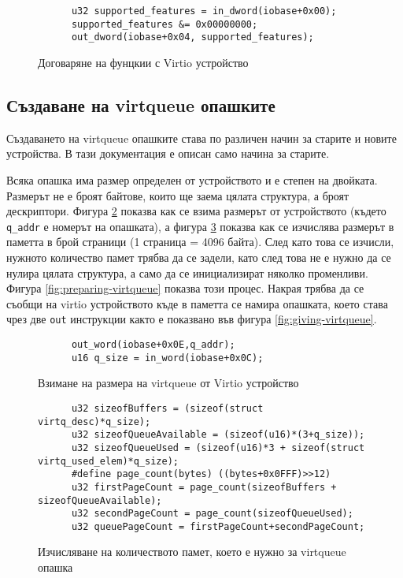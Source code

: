   \begin{figure}[ht]
    \centering
    \begin{verbatim}
      u32 supported_features = in_dword(iobase+0x00);
      supported_features &= 0x00000000;
      out_dword(iobase+0x04, supported_features);
    \end{verbatim}
    \caption{Договаряне на фунцкии с Virtio устройство}
    \label{fig:disabling-all-features}
  \end{figure}

  \subsection{Създаване на virtqueue опашките}
  Създаването на virtqueue опашките става по различен начин за старите и новите устройства. В тази документация е описан само начина за старите.

  Всяка опашка има размер определен от устройството и е степен на двойката. Размерът не е броят байтове, които ще заема цялата структура, а броят дескриптори. Фигура \ref{fig:getting-virtqueue-size} показва как се взима размерът от устройството (където {\tt q\_addr} е номерът на опашката), а фигура \ref{fig:calculating-virtqueue-size} показва как се изчислява размерът в паметта в брой страници (1 страница = 4096 байта). След като това се изчисли, нужното количество памет трябва да се задели, като след това не е нужно да се нулира цялата структура, а само да се инициализират няколко променливи. Фигура \ref{fig:preparing-virtqueue} показва този процес. Накрая трябва да се съобщи на virtio устройството къде в паметта се намира опашката, което става чрез две {\tt out} инструкции както е показвано във фигура \ref{fig:giving-virtqueue}.

  \begin{figure}[ht]
    \centering
    \begin{verbatim}
      out_word(iobase+0x0E,q_addr);
      u16 q_size = in_word(iobase+0x0C);
    \end{verbatim}
    \caption{Взимане на размера на virtqueue от Virtio устройство}
    \label{fig:getting-virtqueue-size}
  \end{figure}

  \begin{figure}[ht]
    \centering
    \begin{verbatim}
      u32 sizeofBuffers = (sizeof(struct virtq_desc)*q_size);
      u32 sizeofQueueAvailable = (sizeof(u16)*(3+q_size));
      u32 sizeofQueueUsed = (sizeof(u16)*3 + sizeof(struct virtq_used_elem)*q_size);
      #define page_count(bytes) ((bytes+0x0FFF)>>12)
      u32 firstPageCount = page_count(sizeofBuffers + sizeofQueueAvailable);
      u32 secondPageCount = page_count(sizeofQueueUsed);
      u32 queuePageCount = firstPageCount+secondPageCount;
    \end{verbatim}
    \caption{Изчисляване на количеството памет, което е нужно за virtqueue опашка}
    \label{fig:calculating-virtqueue-size}
  \end{figure}

